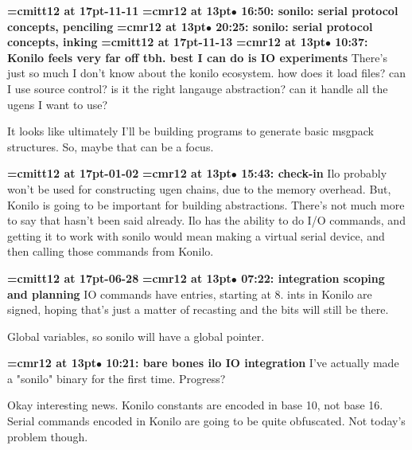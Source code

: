 {\medskip\noindent\bf\font\titlefont=cmitt12 at 17pt-11-11}\medskip
{\smallskip\noindent\bf\font\titlefont=cmr12 at 13pt\titlefont $\bullet$ 16:50: sonilo: serial protocol concepts, penciling}\smallskip
{\smallskip\noindent\bf\font\titlefont=cmr12 at 13pt\titlefont $\bullet$ 20:25: sonilo: serial protocol concepts, inking}\smallskip
{\medskip\noindent\bf\font\titlefont=cmitt12 at 17pt-11-13}\medskip
{\smallskip\noindent\bf\font\titlefont=cmr12 at 13pt\titlefont $\bullet$ 10:37: Konilo feels very far off tbh. best I can do is IO experiments}\smallskip
There's just so much I don't know about the konilo ecosystem. how does it load files? can I use source control? is it the right langauge abstraction? can it handle all the ugens I want to use?
\par

It looks like ultimately I'll be building programs to generate basic msgpack structures. So, maybe that can be a focus.
\par

{\medskip\noindent\bf\font\titlefont=cmitt12 at 17pt-01-02}\medskip
{\smallskip\noindent\bf\font\titlefont=cmr12 at 13pt\titlefont $\bullet$ 15:43: check-in}\smallskip
Ilo probably won't be used for constructing ugen chains, due to the memory overhead. But, Konilo is going to be important for building abstractions. There's not much more to say that hasn't been said already. Ilo has the ability to do I/O commands, and getting it to work with sonilo would mean making a virtual serial device, and then calling those commands from Konilo.
\par

{\medskip\noindent\bf\font\titlefont=cmitt12 at 17pt-06-28}\medskip
{\smallskip\noindent\bf\font\titlefont=cmr12 at 13pt\titlefont $\bullet$ 07:22: integration scoping and planning}\smallskip
IO commands have entries, starting at 8. ints in Konilo are signed, hoping that's just a matter of recasting and the bits will still be there.
\par

Global variables, so sonilo will have a global pointer.
\par

{\smallskip\noindent\bf\font\titlefont=cmr12 at 13pt\titlefont $\bullet$ 10:21: bare bones ilo IO integration}\smallskip
I've actually made a "sonilo" binary for the first time. Progress?
\par

Okay interesting news. Konilo constants are encoded in base 10, not base 16. Serial commands encoded in Konilo are going to be quite obfuscated. Not today's problem though.
\par

